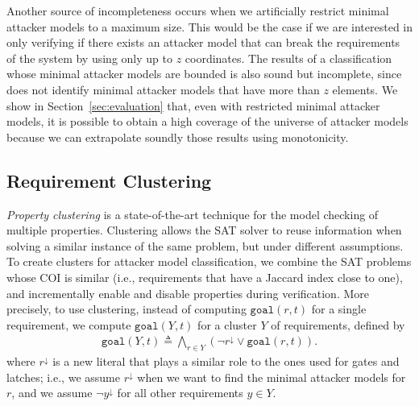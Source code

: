 Another source of incompleteness occurs when we artificially restrict minimal attacker models to a maximum size. This would be the case if we are interested in only verifying if there exists an attacker model that can break the requirements of the system by using only up to $z$ coordinates. The results of a classification whose minimal attacker models are bounded is also sound but incomplete, since does not identify minimal attacker models that have more than $z$ elements. We show in Section~\ref{sec:evaluation} that, even with restricted minimal attacker models, it is possible to obtain a high coverage of the universe of attacker models because we can extrapolate soundly those results using monotonicity.



\subsection{Requirement Clustering}
\emph{Property clustering} \cite{ToSplitOrToGroup,HandbookOfSatisfiability,OptimizedModelCheckingOfMultipleProperties} is a state-of-the-art technique for the model checking of multiple properties. 
Clustering allows the SAT solver to reuse information when solving a similar instance of the same problem, but under different assumptions. 
To create clusters for attacker model classification, we combine the SAT problems whose COI is similar (i.e., requirements that have a Jaccard index close to one), and incrementally enable and disable properties during verification. 
More precisely, to use clustering, instead of computing $\mathtt{goal}(r,t)$ for a single requirement, we compute $\mathtt{goal}(Y,t)$ for a cluster $Y$ of requirements, defined by 
\begin{align}
\mathtt{goal}(Y,t) \triangleq \bigwedge_{r\in Y} (\lnot r^\downarrow \lor \mathtt{goal}(r,t)).
\end{align}
where $r^\downarrow$ is a new literal that plays a similar role to the ones used for gates and latches; i.e., we assume $r^\downarrow$ when we want to find the minimal attacker models for $r$, and we assume $\lnot y^\downarrow$ for all other requirements $y \in Y$. 

